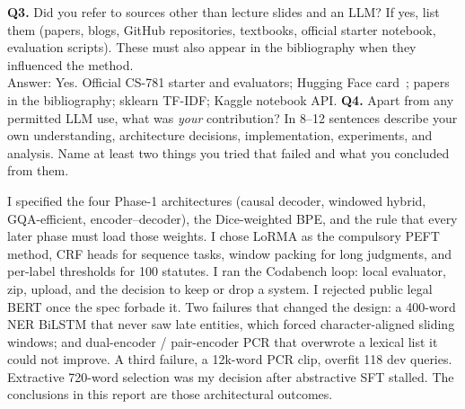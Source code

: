 \documentclass[11pt, oneside]{article}
\begin{document}
\medskip
\noindent
\textbf{Q3.} Did you refer to sources other than lecture slides and an LLM?
If yes, list them (papers, blogs, GitHub repositories, textbooks, official starter notebook, evaluation scripts). These must also appear in the bibliography when they influenced the method. \\[0.4em]
Answer: Yes. Official CS-781 starter and evaluators; Hugging Face card~\cite{cs781capstone}; papers in the bibliography; sklearn TF-IDF; Kaggle notebook API.
\medskip
\noindent
\textbf{Q4.} Apart from any permitted LLM use, what was \emph{your} contribution? In 8--12 sentences describe your own understanding, architecture decisions, implementation, experiments, and analysis. Name at least two things you tried that failed and what you concluded from them.

I specified the four Phase-1 architectures (causal decoder, windowed hybrid, GQA-efficient, encoder--decoder), the Dice-weighted BPE, and the rule that every later phase must load those weights. I chose LoRMA as the compulsory PEFT method, CRF heads for sequence tasks, window packing for long judgments, and per-label thresholds for 100 statutes. I ran the Codabench loop: local evaluator, zip, upload, and the decision to keep or drop a system. I rejected public legal BERT once the spec forbade it. Two failures that changed the design: a 400-word NER BiLSTM that never saw late entities, which forced character-aligned sliding windows; and dual-encoder / pair-encoder PCR that overwrote a lexical list it could not improve. A third failure, a 12k-word PCR clip, overfit 118 dev queries. Extractive 720-word selection was my decision after abstractive SFT stalled. The conclusions in this report are those architectural outcomes.



\end{document}
